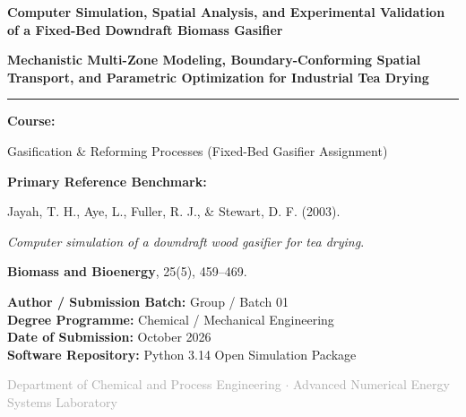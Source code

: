 \documentclass[11pt,a4paper]{article}
\begin{document}
\begin{titlepage}
    \centering
    \vspace*{1.5cm}
    
    {\Huge\bfseries\color{primary} Computer Simulation, Spatial Analysis, and Experimental Validation of a Fixed-Bed Downdraft Biomass Gasifier\par}
    
    \vspace{0.8cm}
    {\Large\color{secondary}\bfseries Mechanistic Multi-Zone Modeling, Boundary-Conforming Spatial Transport, and Parametric Optimization for Industrial Tea Drying\par}
    
    \vspace{1.5cm}
    \rule{0.8\textwidth}{1.2pt}\par
    \vspace{1.2cm}
    
    {\large\bfseries Course:\par}
    {\large Gasification \& Reforming Processes (Fixed-Bed Gasifier Assignment)\par}
    \vspace{0.8cm}
    
    {\large\bfseries Primary Reference Benchmark:\par}
    {\normalsize Jayah, T. H., Aye, L., Fuller, R. J., \& Stewart, D. F. (2003).\par
    \textit{Computer simulation of a downdraft wood gasifier for tea drying}.\par
    \textbf{Biomass and Bioenergy}, 25(5), 459--469.\par}
    
    \vspace{1.5cm}
    
    \begin{minipage}{0.65\textwidth}
        \centering
        \textbf{Author / Submission Batch:} Group / Batch 01\\
        \textbf{Degree Programme:} Chemical / Mechanical Engineering\\
        \textbf{Date of Submission:} October 2026\\
        \textbf{Software Repository:} Python 3.14 Open Simulation Package
    \end{minipage}
    
    \vfill
    {\footnotesize\textcolor{darkgray}{Department of Chemical and Process Engineering $\cdot$ Advanced Numerical Energy Systems Laboratory}\par}
\end{titlepage}
\end{document}
